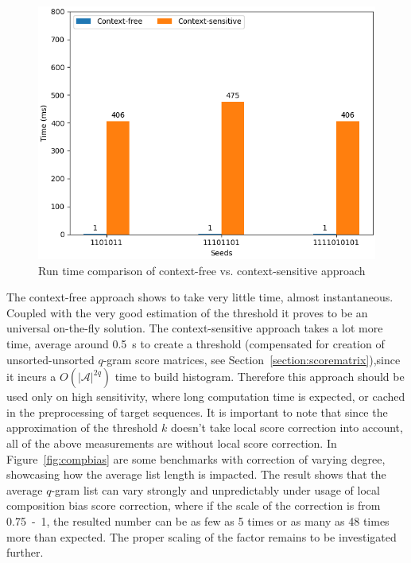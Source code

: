 \documentclass[twoside,a4paper,bsc]{master}
\newcommand{\Qgram}[1]{\(#1\)-gram}
\newcommand{\Alpha}[0]{\mathcal{A}}
\begin{document}
\begin{figure}
\centering
\includegraphics[scale=0.6]{graphics/speed_threshold.png}
\caption{Run time comparison of context-free vs. context-sensitive
approach}
\label{fig:sens_runtime}
\end{figure}
The context-free approach shows to take very little time, almost
instantaneous.
Coupled with the very good estimation of the threshold it proves to be an
universal on-the-fly solution. The context-sensitive approach takes a lot
more
time, average around 0.5~s to create a threshold (compensated for creation
of
unsorted-unsorted \Qgram{q} score matrices, see
Section~\ref{section:scorematrix}),since it incurs a \(O(|\Alpha|^{2q})\)
time to build histogram. Therefore this approach should be used only on
high sensitivity, where long computation time is expected, or cached in the
preprocessing of target sequences.
It is important to note that since the approximation of the threshold \(k\)
doesn't take local score correction into account, all of the above
measurements are without local score correction. In
Figure~\ref{fig:compbias} are some benchmarks with correction of varying
degree, showcasing how the average list length is impacted. The result
shows that the average \Qgram{q} list can vary strongly and unpredictably
under usage of local composition bias score correction, where if the scale
of the correction is from 0.75~-~1, the resulted number can be as few as 5
times or as many as 48 times more than expected. The proper scaling of the
factor remains to be investigated further.
\end{document}
